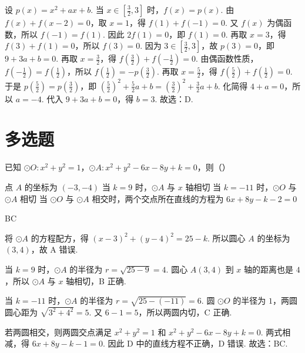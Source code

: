 \begin{solution}
设 \(p(x)=x^2+ax+b\). 当 \(x\in \left[ \frac{3}{2},3 \right]\) 时，\(f(x)=p(x)\).
由 \(f(x)+f(x-2)=0\)，取 \(x=1\)，得 \(f(1)+f(-1)=0\). 又 \(f(x)\) 为偶函数，所以 \(f(-1)=f(1)\). 因此 \(2f(1)=0\)，即 \(f(1)=0\). 再取 \(x=3\)，得 \(f(3)+f(1)=0\)，所以 \(f(3)=0\). 因为 \(3\in \left[ \frac{3}{2},3 \right]\)，故 \(p(3)=0\)，即 \(9+3a+b=0\).
再取 \(x=\frac{3}{2}\)，得 \(f\left( \frac{3}{2} \right)+f\left( -\frac{1}{2} \right)=0\). 由偶函数性质，\(f\left( -\frac{1}{2} \right)=f\left( \frac{1}{2} \right)\)，所以 \(f\left( \frac{1}{2} \right)=-p\left( \frac{3}{2} \right)\). 再取 \(x=\frac{5}{2}\)，得 \(f\left( \frac{5}{2} \right)+f\left( \frac{1}{2} \right)=0\). 于是 \(p\left( \frac{5}{2} \right)=p\left( \frac{3}{2} \right)\)，即 \(\left( \frac{5}{2} \right)^2+\frac{5}{2}a+b=\left( \frac{3}{2} \right)^2+\frac{3}{2}a+b\).
化简得 \(4+a=0\)，所以 \(a=-4\). 代入 \(9+3a+b=0\)，得 \(b=3\). 故选：D.
\end{solution}
\section{多选题}

\begin{problem}
已知 \(\odot O:x^2+y^2=1\)，\(\odot A:x^2+y^2-6x-8y+k=0\)，则（\quad）

\choices
    {点 \(A\) 的坐标为 \(\left( -3,-4 \right)\)}
    {当 \(k=9\) 时，\(\odot A\) 与 \(x\) 轴相切}
    {当 \(k=-11\) 时，\(\odot O\) 与 \(\odot A\) 相切}
    {当 \(\odot O\) 与 \(\odot A\) 相交时，两个交点所在直线的方程为 \(6x+8y-k-2=0\)}
\end{problem}

\begin{answer}
BC
\end{answer}

\begin{solution}
将 \(\odot A\) 的方程配方，得 \(\left( x-3 \right)^2+\left( y-4 \right)^2=25-k\). 所以圆心 \(A\) 的坐标为 \(\left( 3,4 \right)\)，故 A 错误.

当 \(k=9\) 时，\(\odot A\) 的半径为 \(r=\sqrt{25-9}=4\). 圆心 \(A\left( 3,4 \right)\) 到 \(x\) 轴的距离也是 \(4\)，所以 \(\odot A\) 与 \(x\) 轴相切，B 正确.

当 \(k=-11\) 时，\(\odot A\) 的半径为 \(r=\sqrt{25-(-11)}=6\). 圆 \(\odot O\) 的半径为 \(1\)，两圆圆心距为 \(\sqrt{3^2+4^2}=5\). 又 \(6-1=5\)，所以两圆内切，C 正确.

若两圆相交，则两圆交点满足 \(x^2+y^2=1\) 和 \(x^2+y^2-6x-8y+k=0\). 两式相减，得 \(6x+8y-k-1=0\). 因此 D 中的直线方程不正确，D 错误.
故选：BC.
\end{solution}

